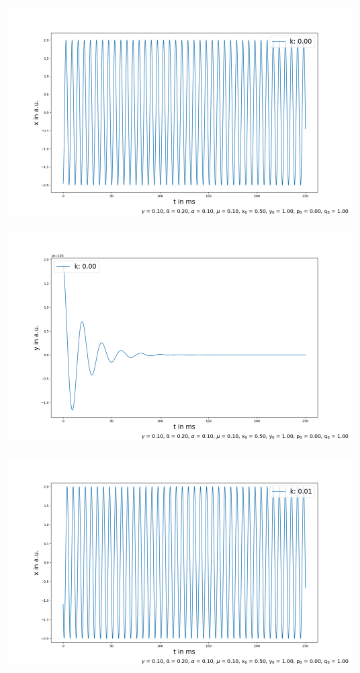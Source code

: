 \documentclass[oneside,10pt,a4paper]{report}
\begin{document}
		\begin{figure}[H]
			\centering
			\begin{subfigure}[b]{0.45\textwidth}
				\includegraphics[width=\textwidth]{x_k1.png}
				\caption{}
				\label{fig:x1}
			\end{subfigure}
			\hfill
			\begin{subfigure}[b]{0.45\textwidth}
				\includegraphics[width=\textwidth]{y_k1.png}
				\caption{}
				\label{fig: y1}
			\end{subfigure}
				\begin{subfigure}[b]{0.45\textwidth}
				\includegraphics[width=\textwidth]{x_k5.png}

\end{subfigure}
\end{figure}
\end{document}
